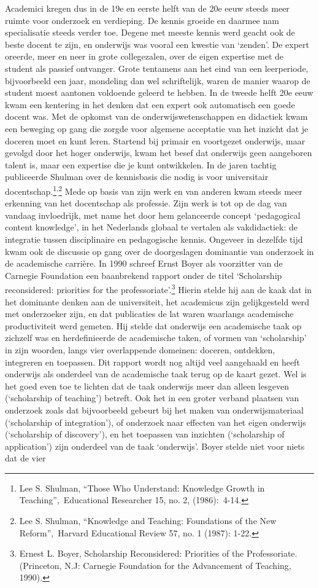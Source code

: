 \documentclass{jote-book}
\begin{document}
	Academici kregen dus in de 19e en eerste helft van de 20e eeuw steeds meer ruimte voor onderzoek en verdieping. De kennis groeide en daarmee nam specialisatie steeds verder toe. Degene met meeste kennis werd geacht ook de beste docent te zijn, en onderwijs was vooral een kwestie van ‘zenden'. De expert oreerde, meer en neer in grote collegezalen, over de eigen expertise met de student als passief ontvanger. Grote tentamens aan het eind van een leerperiode, bijvoorbeeld een jaar, mondeling dan wel schriftelijk, waren de manier waarop de student moest aantonen voldoende geleerd te hebben. In de tweede helft 20e eeuw kwam een kentering in het denken dat een expert ook automatisch een goede docent was. Met de opkomst van de onderwijswetenschappen en didactiek kwam een beweging op gang die zorgde voor algemene acceptatie van het inzicht dat je doceren moet en kunt leren. Startend bij primair en voortgezet onderwijs, maar gevolgd door het hoger onderwijs, kwam het besef dat onderwijs geen aangeboren talent is, maar een expertise die je kunt ontwikkelen. In de jaren tachtig publiceerde Shulman over de kennisbasis die nodig is voor universitair docentschap.\footnote{Lee S. Shulman, “Those Who Understand: Knowledge Growth in Teaching”, Educational Researcher 15, no. 2, (1986): 4-14.}\textsuperscript{,}\footnote{Lee S. Shulman, “Knowledge and Teaching: Foundations of the New Reform”, Harvard Educational Review 57, no. 1 (1987): 1-22.} Mede op basis van zijn werk en van anderen kwam steeds meer erkenning van het docentschap als professie. Zijn werk is tot op de dag van vandaag invloedrijk, met name het door hem gelanceerde concept ‘pedagogical content knowledge', in het Nederlands globaal te vertalen als vakdidactiek: de integratie tussen disciplinaire en pedagogische kennis. Ongeveer in dezelfde tijd kwam ook de discussie op gang over de doorgeslagen dominantie van onderzoek in de academische carrière. In 1990 schreef Ernst Boyer als voorzitter van de Carnegie Foundation een baanbrekend rapport onder de titel ‘Scholarship reconsidered: priorities for the professoriate'.\footnote{Ernest L. Boyer, Scholarship Reconsidered: Priorities of the Professoriate. (Princeton, N.J: Carnegie Foundation for the Advancement of Teaching, 1990). } Hierin stelde hij aan de kaak dat in het dominante denken aan de universiteit, het academicus zijn gelijkgesteld werd met onderzoeker zijn, en dat publicaties de lat waren waarlangs academische productiviteit werd gemeten. Hij stelde dat onderwijs een academische taak op zichzelf was en herdefinieerde de academische taken, of vormen van ‘scholarship' in zijn woorden, langs vier overlappende domeinen: doceren, ontdekken, integreren en toepassen. Dit rapport wordt nog altijd veel aangehaald en heeft onderwijs als onderdeel van de academische taak terug op de kaart gezet. Wel is het goed even toe te lichten dat de taak onderwijs meer dan alleen lesgeven (‘scholarship of teaching') betreft. Ook het in een groter verband plaatsen van onderzoek zoals dat bijvoorbeeld gebeurt bij het maken van onderwijsmateriaal (‘scholarship of integration'), of onderzoek naar effecten van het eigen onderwijs (‘scholarship of discovery'), en het toepassen van inzichten (‘scholarship of application') zijn onderdeel van de taak ‘onderwijs'. Boyer stelde niet voor niets dat de vier 
\end{document}
